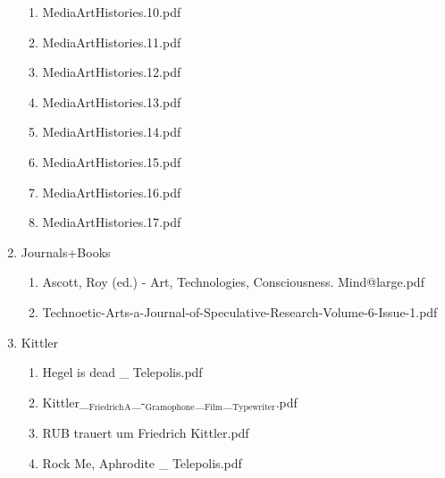 \documentclass[11pt]{article}
\begin{document}
\begin{enumerate}
\begin{enumerate}
\item MediaArtHistories.10.pdf
\label{sec-1-1-1-1-11-24-32-10}

\item MediaArtHistories.11.pdf
\label{sec-1-1-1-1-11-24-32-11}

\item MediaArtHistories.12.pdf
\label{sec-1-1-1-1-11-24-32-12}

\item MediaArtHistories.13.pdf
\label{sec-1-1-1-1-11-24-32-13}

\item MediaArtHistories.14.pdf
\label{sec-1-1-1-1-11-24-32-14}

\item MediaArtHistories.15.pdf
\label{sec-1-1-1-1-11-24-32-15}

\item MediaArtHistories.16.pdf
\label{sec-1-1-1-1-11-24-32-16}

\item MediaArtHistories.17.pdf
\label{sec-1-1-1-1-11-24-32-17}
\end{enumerate}

\item Journals+Books
\label{sec-1-1-1-1-11-24-33}
\begin{enumerate}
\item Ascott, Roy (ed.) - Art, Technologies, Consciousness. Mind@large.pdf
\label{sec-1-1-1-1-11-24-33-1}

\item Technoetic-Arts-a-Journal-of-Speculative-Research-Volume-6-Issue-1.pdf
\label{sec-1-1-1-1-11-24-33-2}
\end{enumerate}

\item Kittler
\label{sec-1-1-1-1-11-24-34}
\begin{enumerate}
\item Hegel is dead \_ Telepolis.pdf
\label{sec-1-1-1-1-11-24-34-1}

\item Kittler\_$_{\text{Friedrich}}$$_{\text{A}}$\_-$_{\text{Gramophone}}$\_$_{\text{Film}}$\_$_{\text{Typewriter}}$.pdf
\label{sec-1-1-1-1-11-24-34-2}

\item RUB trauert um Friedrich Kittler.pdf
\label{sec-1-1-1-1-11-24-34-3}

\item Rock Me, Aphrodite \_ Telepolis.pdf
\label{sec-1-1-1-1-11-24-34-4}
\end{enumerate}


\end{enumerate}
\end{document}
